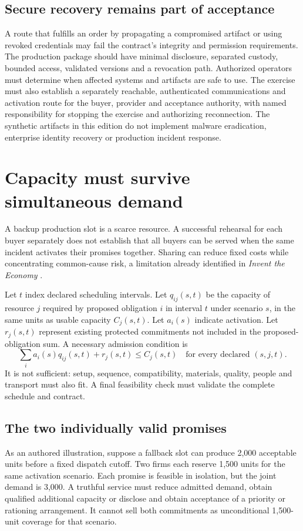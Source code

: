 \documentclass[11pt,a4paper]{article}
\begin{document}
\subsection{Secure recovery remains part of acceptance}
A route that fulfills an order by propagating a compromised artifact or using revoked credentials may fail the contract's integrity and permission requirements. The production package should have minimal disclosure, separated custody, bounded access, validated versions and a revocation path. Authorized operators must determine when affected systems and artifacts are safe to use. The exercise must also establish a separately reachable, authenticated communications and activation route for the buyer, provider and acceptance authority, with named responsibility for stopping the exercise and authorizing reconnection. The synthetic artifacts in this edition do not implement malware eradication, enterprise identity recovery or production incident response.

\section{Capacity must survive simultaneous demand}\label{sec:capacity}
A backup production slot is a scarce resource. A successful rehearsal for each buyer separately does not establish that all buyers can be served when the same incident activates their promises together. Sharing can reduce fixed costs while concentrating common-cause risk, a limitation already identified in \emph{Invent the Economy} \cite[Section 12.2]{boucherEconomy}.

Let $t$ index declared scheduling intervals. Let $q_{ij}(s,t)$ be the capacity of resource $j$ required by proposed obligation $i$ in interval $t$ under scenario $s$, in the same units as usable capacity $C_j(s,t)$. Let $a_i(s)$ indicate activation. Let $r_j(s,t)$ represent existing protected commitments not included in the proposed-obligation sum. A necessary admission condition is
\begin{equation}
\sum_i a_i(s)q_{ij}(s,t)+r_j(s,t)\leq C_j(s,t)
\quad\text{for every declared }(s,j,t).
\label{eq:capacity}
\end{equation}
It is not sufficient: setup, sequence, compatibility, materials, quality, people and transport must also fit. A final feasibility check must validate the complete schedule and contract.

\subsection{The two individually valid promises}
As an authored illustration, suppose a fallback slot can produce 2,000 acceptable units before a fixed dispatch cutoff. Two firms each reserve 1,500 units for the same activation scenario. Each promise is feasible in isolation, but the joint demand is 3,000. A truthful service must reduce admitted demand, obtain qualified additional capacity or disclose and obtain acceptance of a priority or rationing arrangement. It cannot sell both commitments as unconditional 1,500-unit coverage for that scenario.
\end{document}
